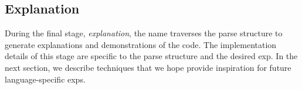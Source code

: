 \subsection{Explanation}

During the final stage, \emph{explanation}, the \Gls{name} traverses the parse structure to generate explanations and demonstrations of the code.
The implementation details of this stage are specific to the parse structure and the desired \gls{exp}.
In the next section, we describe techniques that we hope provide inspiration for future language-specific \glspl{exp}.
